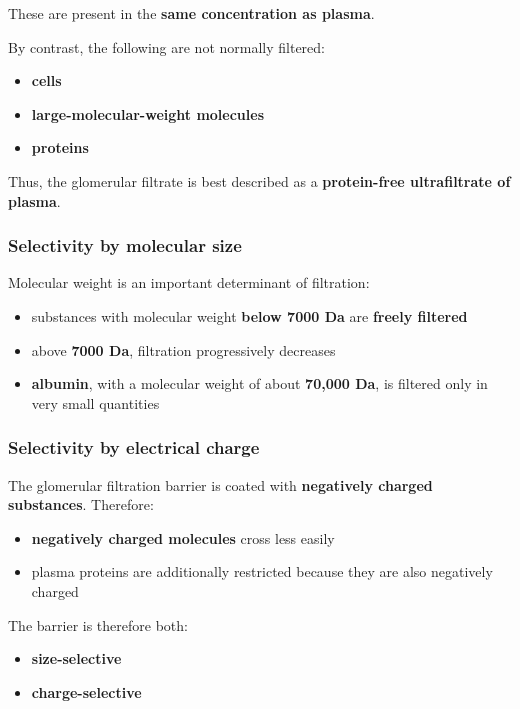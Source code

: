\documentclass[11pt,a4paper]{article}
\begin{document}
These are present in the \textbf{same concentration as plasma}.

By contrast, the following are not normally filtered:
\begin{itemize}
    \item \textbf{cells}
    \item \textbf{large-molecular-weight molecules}
    \item \textbf{proteins}
\end{itemize}

Thus, the glomerular filtrate is best described as a \textbf{protein-free ultrafiltrate of plasma}.

\subsubsection{Selectivity by molecular size}

Molecular weight is an important determinant of filtration:
\begin{itemize}
    \item substances with molecular weight \textbf{below 7000 Da} are \textbf{freely filtered}
    \item above \textbf{7000 Da}, filtration progressively decreases
    \item \textbf{albumin}, with a molecular weight of about \textbf{70{,}000 Da}, is filtered only in very small quantities
\end{itemize}

\subsubsection{Selectivity by electrical charge}

The glomerular filtration barrier is coated with \textbf{negatively charged substances}. Therefore:
\begin{itemize}
    \item \textbf{negatively charged molecules} cross less easily
    \item plasma proteins are additionally restricted because they are also negatively charged
\end{itemize}

The barrier is therefore both:
\begin{itemize}
    \item \textbf{size-selective}
    \item \textbf{charge-selective}
\end{itemize}
\end{document}
